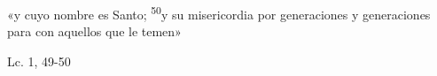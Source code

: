 \documentclass[../../rosario.tex]{subfiles}
\begin{document}
    «y cuyo nombre es Santo; \textsuperscript{50}y su misericordia por generaciones y generaciones para con aquellos que le temen»
    \begin{flushright}
    Lc. 1, 49-50          
    \end{flushright}
\end{document}

